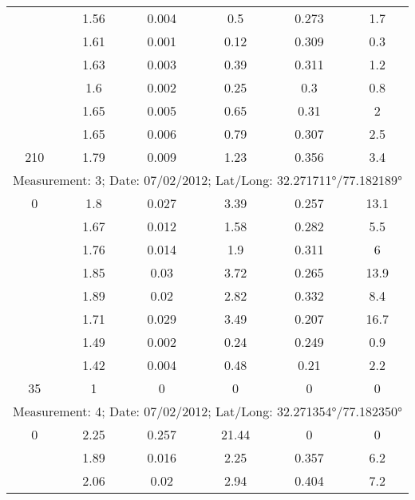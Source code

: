 \begin{longtable}{cccccc}
		& 1.56  & 0.004 & 0.5   & 0.273 & 1.7 \\
		
		& 1.61  & 0.001 & 0.12  & 0.309 & 0.3 \\
		
		& 1.63  & 0.003 & 0.39  & 0.311 & 1.2 \\
		
		& 1.6   & 0.002 & 0.25  & 0.3   & 0.8 \\
		
		& 1.65  & 0.005 & 0.65  & 0.31  & 2 \\
		
		& 1.65  & 0.006 & 0.79  & 0.307 & 2.5 \\
		
		210   & 1.79  & 0.009 & 1.23  & 0.356 & 3.4 \\
		\midrule
		\multicolumn{6}{l}{Measurement: 3; Date: 07/02/2012;
			Lat/Long: 32.271711°/77.182189°} \\	
		\midrule 		
		0     & 1.8   & 0.027 & 3.39  & 0.257 & 13.1 \\
		
		& 1.67  & 0.012 & 1.58  & 0.282 & 5.5 \\
		
		& 1.76  & 0.014 & 1.9   & 0.311 & 6 \\
		
		& 1.85  & 0.03  & 3.72  & 0.265 & 13.9 \\
		
		& 1.89  & 0.02  & 2.82  & 0.332 & 8.4 \\
		
		& 1.71  & 0.029 & 3.49  & 0.207 & 16.7 \\
		
		& 1.49  & 0.002 & 0.24  & 0.249 & 0.9 \\
		
		& 1.42  & 0.004 & 0.48  & 0.21  & 2.2 \\
		
		35    & 1     & 0     & 0     & 0     & 0 \\
		\midrule
		\multicolumn{6}{l}{Measurement: 4; Date: 07/02/2012;
			Lat/Long: 32.271354°/77.182350°} \\		
		\midrule
		0     & 2.25  & 0.257 & 21.44 & 0     & 0 \\
		
		& 1.89  & 0.016 & 2.25  & 0.357 & 6.2 \\
		
		& 2.06  & 0.02  & 2.94  & 0.404 & 7.2 \\
		

\end{longtable}
